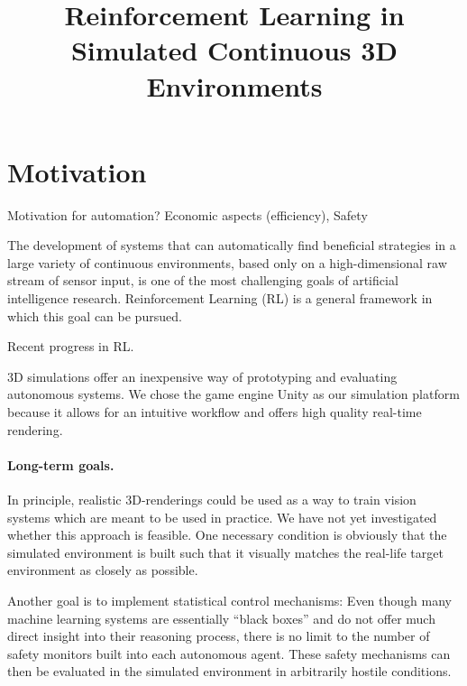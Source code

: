 \documentclass[10pt,a4paper]{article}
\begin{document}
\title{Reinforcement Learning in Simulated Continuous 3D Environments}
\date{}

\maketitle



\section{Motivation}

Motivation for automation?
Economic aspects (efficiency),
Safety

The development of systems that can automatically find beneficial strategies in a large variety of continuous environments, based only on a high-dimensional raw stream of sensor input, is one of the most challenging goals of artificial intelligence research.
Reinforcement Learning (RL) is a general framework in which this goal can be pursued. 

Recent progress in RL.

3D simulations offer an inexpensive way of prototyping and evaluating autonomous systems.
We chose the game engine Unity \cite{?} as our simulation platform because it allows for an intuitive workflow and offers high quality real-time rendering.



\paragraph{Long-term goals.}
In principle, realistic 3D-renderings could be used as a way to train vision systems which are meant to be used in practice.
We have not yet investigated whether this approach is feasible. 
One necessary condition is obviously that the simulated environment is built such that it visually matches the real-life target environment as closely as possible.
 
Another goal is to implement statistical control mechanisms:
Even though many machine learning systems are essentially ``black boxes'' and do not offer much direct insight into their reasoning process, there is no limit to the number of safety monitors built into each autonomous agent. 
These safety mechanisms can then be evaluated in the simulated environment in arbitrarily hostile conditions.
\end{document}
